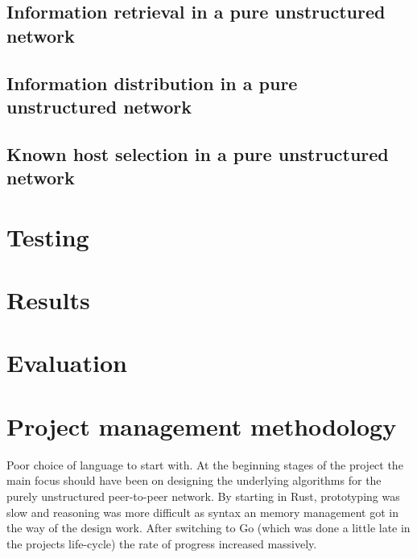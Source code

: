\documentclass[a4paper]{article}
\begin{document}
\subsection{Information retrieval in a pure unstructured network}
\subsection{Information distribution in a pure unstructured network}
\subsection{Known host selection in a pure unstructured network}

\section{Testing}

\section{Results}

\section{Evaluation}

\section{Project management methodology} %
Poor choice of language to start with. At the beginning stages of the project the main focus should have been on designing the underlying algorithms for the purely unstructured peer-to-peer network. By starting in Rust, prototyping was slow and reasoning was more difficult as syntax an memory management got in the way of the design work. After switching to Go (which was done a little late in the projects life-cycle) the rate of progress increased massively.
\end{document}
